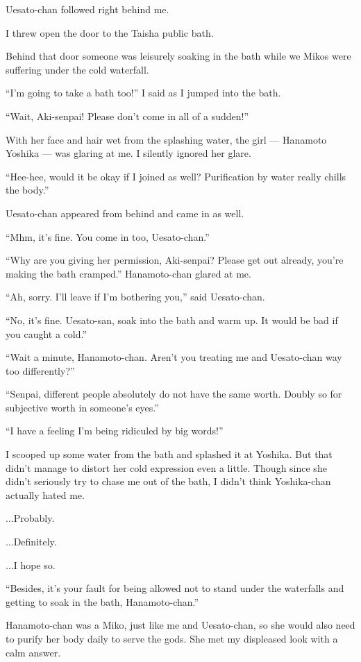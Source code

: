 Uesato-chan followed right behind me.

I threw open the door to the Taisha public bath.

Behind that door someone was leisurely soaking in the bath while we Mikos were suffering under the cold waterfall.

``I'm going to take a bath too!'' I said as I jumped into the bath.

``Wait, Aki-senpai! Please don't come in all of a sudden!''

With her face and hair wet from the splashing water, the girl --- Hanamoto Yoshika --- was glaring at me. I silently ignored her glare.

``Hee-hee, would it be okay if I joined as well? Purification by water really chills the body.''

Uesato-chan appeared from behind and came in as well.

``Mhm, it's fine. You come in too, Uesato-chan.''

``Why are you giving her permission, Aki-senpai? Please get out already, you're making the bath cramped.'' Hanamoto-chan glared at me.

``Ah, sorry. I'll leave if I'm bothering you,'' said Uesato-chan.

``No, it's fine. Uesato-san, soak into the bath and warm up. It would be bad if you caught a cold.''

``Wait a minute, Hanamoto-chan. Aren't you treating me and Uesato-chan way too differently?''

``Senpai, different people absolutely do not have the same worth. Doubly so for subjective worth in someone's eyes.''

``I have a feeling I'm being ridiculed by big words!''

I scooped up some water from the bath and splashed it at Yoshika. But that didn't manage to distort her cold expression even a little. Though since she didn't seriously try to chase me out of the bath, I didn't think Yoshika-chan actually hated me.

...Probably.

...Definitely.

...I hope so.

``Besides, it's your fault for being allowed not to stand under the waterfalls and getting to soak in the bath, Hanamoto-chan.''

Hanamoto-chan was a Miko, just like me and Uesato-chan, so she would also need to purify her body daily to serve the gods. She met my displeased look with a calm answer.


